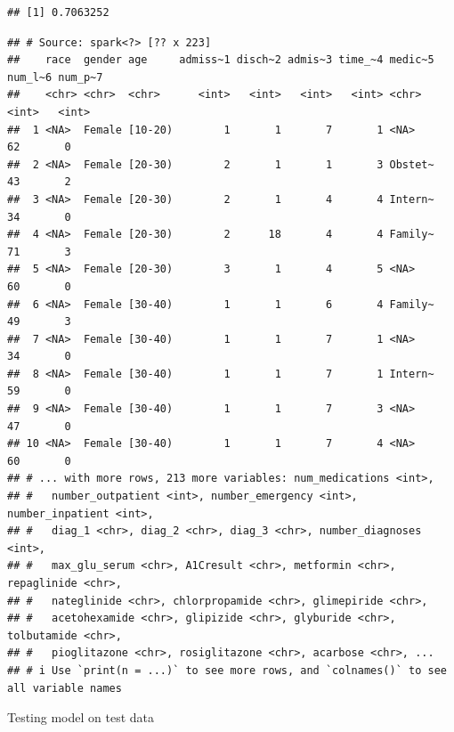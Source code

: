 \documentclass[
]{article}
\newenvironment{Shaded}{\begin{snugshade}}{\end{snugshade}}
\newcommand{\AttributeTok}[1]{\textcolor[rgb]{0.77,0.63,0.00}{#1}}
\newcommand{\FunctionTok}[1]{\textcolor[rgb]{0.00,0.00,0.00}{#1}}
\newcommand{\NormalTok}[1]{#1}
\newcommand{\OtherTok}[1]{\textcolor[rgb]{0.56,0.35,0.01}{#1}}
\newcommand{\SpecialCharTok}[1]{\textcolor[rgb]{0.00,0.00,0.00}{#1}}
\newcommand{\StringTok}[1]{\textcolor[rgb]{0.31,0.60,0.02}{#1}}
\begin{document}
\begin{verbatim}
## [1] 0.7063252
\end{verbatim}

\begin{Shaded}
\end{Shaded}

\begin{verbatim}
## # Source: spark<?> [?? x 223]
##    race  gender age     admiss~1 disch~2 admis~3 time_~4 medic~5 num_l~6 num_p~7
##    <chr> <chr>  <chr>      <int>   <int>   <int>   <int> <chr>     <int>   <int>
##  1 <NA>  Female [10-20)        1       1       7       1 <NA>         62       0
##  2 <NA>  Female [20-30)        2       1       1       3 Obstet~      43       2
##  3 <NA>  Female [20-30)        2       1       4       4 Intern~      34       0
##  4 <NA>  Female [20-30)        2      18       4       4 Family~      71       3
##  5 <NA>  Female [20-30)        3       1       4       5 <NA>         60       0
##  6 <NA>  Female [30-40)        1       1       6       4 Family~      49       3
##  7 <NA>  Female [30-40)        1       1       7       1 <NA>         34       0
##  8 <NA>  Female [30-40)        1       1       7       1 Intern~      59       0
##  9 <NA>  Female [30-40)        1       1       7       3 <NA>         47       0
## 10 <NA>  Female [30-40)        1       1       7       4 <NA>         60       0
## # ... with more rows, 213 more variables: num_medications <int>,
## #   number_outpatient <int>, number_emergency <int>, number_inpatient <int>,
## #   diag_1 <chr>, diag_2 <chr>, diag_3 <chr>, number_diagnoses <int>,
## #   max_glu_serum <chr>, A1Cresult <chr>, metformin <chr>, repaglinide <chr>,
## #   nateglinide <chr>, chlorpropamide <chr>, glimepiride <chr>,
## #   acetohexamide <chr>, glipizide <chr>, glyburide <chr>, tolbutamide <chr>,
## #   pioglitazone <chr>, rosiglitazone <chr>, acarbose <chr>, ...
## # i Use `print(n = ...)` to see more rows, and `colnames()` to see all variable names
\end{verbatim}

Testing model on test data

\begin{Shaded}
\end{Shaded}
\end{document}
